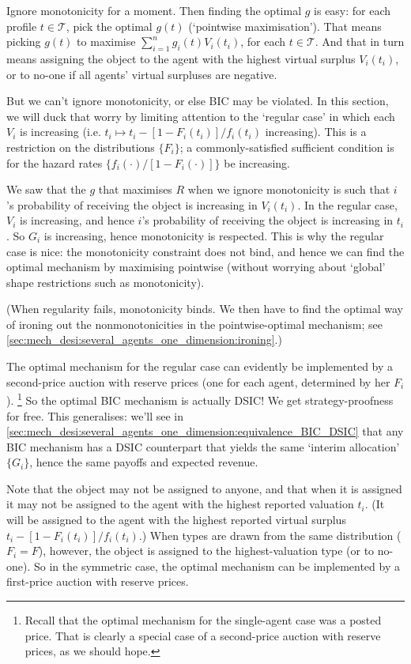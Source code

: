 \documentclass[11pt,letterpaper,reqno,oneside]{article}
\begin{document}
Ignore monotonicity for a moment. Then finding the optimal $g$ is easy: for each profile $t \in \mathcal{T}$, pick the optimal $g(t)$ (`pointwise maximisation'). That means picking $g(t)$ to maximise $\sum_{i=1}^n g_i(t) V_i(t_i)$, for each $t \in \mathcal{T}$. And that in turn means assigning the object to the agent with the highest virtual surplus $V_i(t_i)$, or to no-one if all agents' virtual surpluses are negative.

But we can't ignore monotonicity, or else BIC may be violated. In this section, we will duck that worry by limiting attention to the `regular case' in which each $V_i$ is increasing (i.e. $t_i \mapsto t_i - [1-F_i(t_i)]/f_i(t_i)$ increasing). This is a restriction on the distributions $\{ F_i \}$; a commonly-satisfied sufficient condition is for the hazard rates $\{ f_i(\cdot) / [1-F_i(\cdot)] \}$ be increasing.

We saw that the $g$ that maximises $R$ when we ignore monotonicity is such that $i$'s probability of receiving the object is increasing in $V_i(t_i)$. In the regular case, $V_i$ is increasing, and hence $i$'s probability of receiving the object is increasing in $t_i$. So $G_i$ is increasing, hence monotonicity is respected. This is why the regular case is nice: the monotonicity constraint does not bind, and hence we can find the optimal mechanism by maximising pointwise (without worrying about `global' shape restrictions such as monotonicity).

(When regularity fails, monotonicity binds. We then have to find the optimal way of ironing out the nonmonotonicities in the pointwise-optimal mechanism; see \cref{sec:mech_desi:several_agents_one_dimension:ironing}.)

The optimal mechanism for the regular case can evidently be implemented by a second-price auction with reserve prices (one for each agent, determined by her $F_i$).%
	\footnote{Recall that the optimal mechanism for the single-agent case was a posted price. That is clearly a special case of a second-price auction with reserve prices, as we should hope.}
So the optimal BIC mechanism is actually DSIC! We get strategy-proofness for free. This generalises: we'll see in \cref{sec:mech_desi:several_agents_one_dimension:equivalence_BIC_DSIC} that any BIC mechanism has a DSIC counterpart that yields the same `interim allocation' $\{ G_i \}$, hence the same payoffs and expected revenue.

Note that the object may not be assigned to anyone, and that when it is assigned it may not be assigned to the agent with the highest reported valuation $t_i$. (It will be assigned to the agent with the highest reported virtual surplus $t_i - [1-F_i(t_i)]/f_i(t_i)$.) When types are drawn from the same distribution ($F_i=F$), however, the object is assigned to the highest-valuation type (or to no-one). So in the symmetric case, the optimal mechanism can be implemented by a first-price auction with reserve prices.
\end{document}
